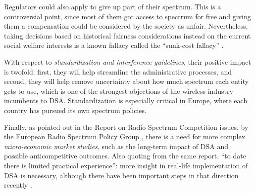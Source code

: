 Regulators could also apply  to give up part of their spectrum. This is a controversial point, since most of them got access to spectrum for free and giving them a compensation could be considered by the society as unfair. Nevertheless, taking decisions based on historical fairness considerations instead on the current social welfare interests is a known fallacy called the \enquote{sunk-cost fallacy} \cite[p. 111]{Nuechterlein2013}. 

With respect to \textit{standardization and interference guidelines}, their positive impact is twofold: first, they will help streamline the administrative processes, and second, they will help remove uncertainty about how much spectrum each entity gets to use, which is one of the strongest objections of the wireless industry incumbents to DSA. Standardization is especially critical in Europe, where each country has pursued its own spectrum policies.
 
Finally, as pointed out in the Report on Radio Spectrum Competition issues, by the European Radio Spectrum Policy Group \cite{ref:RSPG2009}, there is a need for more complex \textit{micro-economic market studies}, such as the long-term impact of DSA and possible anticompetitive outcomes. Also quoting from the same report, \enquote{to date there is limited practical experience}: more insight in real-life implementation of DSA is necessary, although there have been important steps in that direction recently \cite{Matinmikko2013}. 



 




